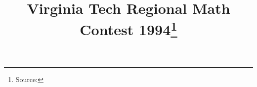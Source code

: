 \documentclass[10pt]{article}
\begin{document}
\title{Virginia Tech Regional Math Contest 1994\footnote{Source: \source}}
\author{\vspace{-2ex}}
\date{\vspace{-6ex}} %
\maketitle








\end{document}
